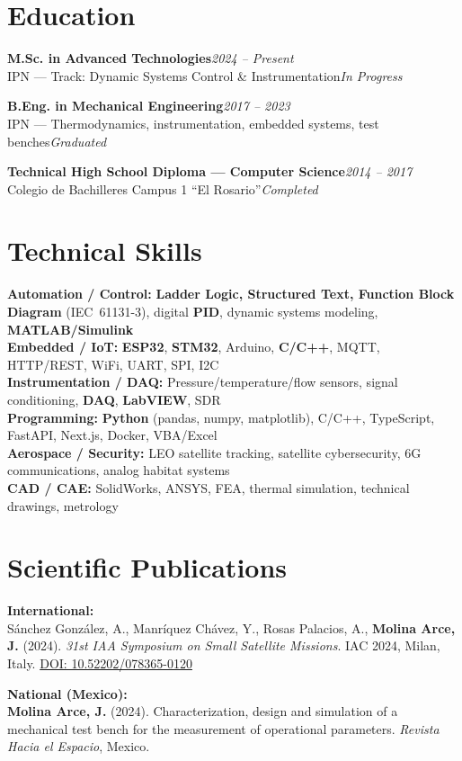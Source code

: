 \documentclass[10pt, letterpaper]{article}
\newcommand{\cvedu}[4]{%
  \vspace{1pt}%
  {\color{azuloscuro}\textbf{#1}}\hfill{\small\color{gristexto}\textit{#2}}\\[-3pt]
  {\small\color{gristexto}#3}\hfill{\small\color{azulmedio}\textit{#4}}%
  \vspace{1pt}%
}
\newcommand{\skillcat}[2]{%
  \textbf{\color{azuloscuro}#1:} {\small\color{gristexto}#2}\\[0.8pt]%
}
\begin{document}
\section{Education}

\cvedu{M.Sc. in Advanced Technologies}{2024 -- Present}{IPN --- Track: Dynamic Systems Control \& Instrumentation}{In Progress}
\vspace{2pt}
\cvedu{B.Eng. in Mechanical Engineering}{2017 -- 2023}{IPN --- Thermodynamics, instrumentation, embedded systems, test benches}{Graduated}
\vspace{2pt}
\cvedu{Technical High School Diploma --- Computer Science}{2014 -- 2017}{Colegio de Bachilleres Campus 1 ``El Rosario''}{Completed}

\section{Technical Skills}

{\small
\skillcat{Automation / Control}{\textbf{Ladder Logic, Structured Text, Function Block Diagram} (IEC~61131-3), digital \textbf{PID}, dynamic systems modeling, \textbf{MATLAB/Simulink}}
\skillcat{Embedded / IoT}{\textbf{ESP32}, \textbf{STM32}, Arduino, \textbf{C/C++}, MQTT, HTTP/REST, WiFi, UART, SPI, I2C}
\skillcat{Instrumentation / DAQ}{Pressure/temperature/flow sensors, signal conditioning, \textbf{DAQ}, \textbf{LabVIEW}, SDR}
\skillcat{Programming}{\textbf{Python} (pandas, numpy, matplotlib), C/C++, TypeScript, FastAPI, Next.js, Docker, VBA/Excel}
\skillcat{Aerospace / Security}{LEO satellite tracking, satellite cybersecurity, 6G communications, analog habitat systems}
\skillcat{CAD / CAE}{SolidWorks, ANSYS, FEA, thermal simulation, technical drawings, metrology}
}

\section{Scientific Publications}

{\small\color{gristexto}
\textbf{International:}\\
S\'{a}nchez Gonz\'{a}lez, A., Manr\'{i}quez Ch\'{a}vez, Y., Rosas Palacios, A., \textbf{Molina Arce, J.} (2024). \textit{31st IAA Symposium on Small Satellite Missions}. IAC 2024, Milan, Italy.
\href{https://doi.org/10.52202/078365-0120}{DOI: 10.52202/078365-0120}

\vspace{2pt}
\textbf{National (Mexico):}\\
\textbf{Molina Arce, J.} (2024). Characterization, design and simulation of a mechanical test bench for the measurement of operational parameters. \textit{Revista Hacia el Espacio}, Mexico.
}
\end{document}
